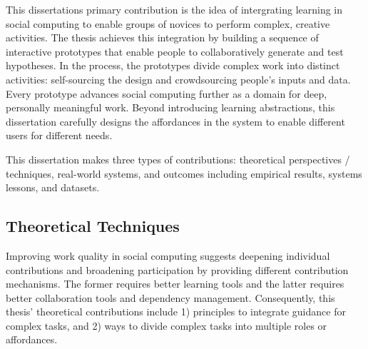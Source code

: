 This dissertation\textquotesingle s primary contribution is the idea of intergrating learning in social computing to enable groups of novices to perform complex, creative activities. The thesis achieves this integration by building a sequence of interactive prototypes that enable people to collaboratively generate and test hypotheses. In the process, the prototypes divide complex work into distinct activities: self-sourcing the design and crowdsourcing people's inputs and data. Every prototype advances social computing further as a domain for deep, personally meaningful work. Beyond introducing learning abstractions, this dissertation carefully designs the affordances in the system to enable different users for different needs. 

This dissertation makes three types of contributions: theoretical perspectives / techniques, real-world systems, and outcomes including empirical results, systems lessons, and datasets. 

\subsection{Theoretical  Techniques}
Improving  work quality in social computing suggests deepening individual contributions and broadening participation by providing different contribution mechanisms. The former requires better learning tools and the latter requires better collaboration tools and dependency management. Consequently, this thesis' theoretical contributions include 1) principles to integrate guidance for complex tasks, and 2) ways to divide complex tasks into multiple roles or affordances.


